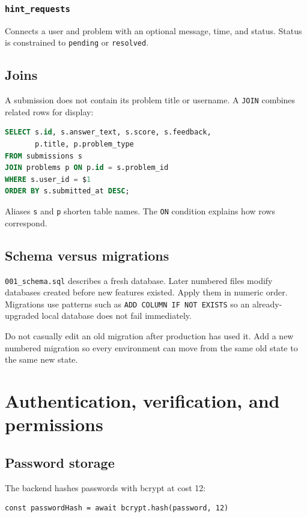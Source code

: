 \documentclass[11pt,oneside]{book}
\newcommand{\file}[1]{\texttt{#1}}
\newcommand{\code}[1]{\texttt{#1}}
\begin{document}
\subsection{\code{hint\_requests}}
Connects a user and problem with an optional message, time, and status. Status is constrained to \code{pending} or \code{resolved}.

\section{Joins}
A submission does not contain its problem title or username. A \code{JOIN} combines related rows for display:

\begin{lstlisting}[language=SQL]
SELECT s.id, s.answer_text, s.score, s.feedback,
       p.title, p.problem_type
FROM submissions s
JOIN problems p ON p.id = s.problem_id
WHERE s.user_id = $1
ORDER BY s.submitted_at DESC;
\end{lstlisting}

Aliases \code{s} and \code{p} shorten table names. The \code{ON} condition explains how rows correspond.

\section{Schema versus migrations}
\file{001\_schema.sql} describes a fresh database. Later numbered files modify databases created before new features existed. Apply them in numeric order. Migrations use patterns such as \code{ADD COLUMN IF NOT EXISTS} so an already-upgraded local database does not fail immediately.

Do not casually edit an old migration after production has used it. Add a new numbered migration so every environment can move from the same old state to the same new state.

\chapter{Authentication, verification, and permissions}

\section{Password storage}
The backend hashes passwords with bcrypt at cost 12:

\begin{lstlisting}
const passwordHash = await bcrypt.hash(password, 12)
\end{lstlisting}
\end{document}
